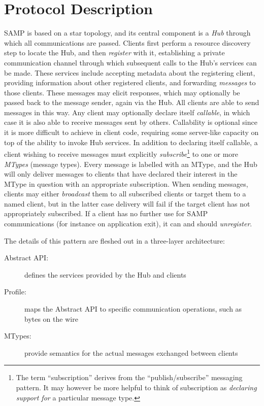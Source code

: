 \documentclass[5p]{elsarticle}
\begin{document}
\section{Protocol Description} \label{sec:protocol}

SAMP is based on a star topology, and its central component is a
{\em Hub\/} through which all communications are passed.
Clients first perform a resource discovery step to locate the Hub,
and then {\em register\/} with it, establishing a private communication
channel through which subsequent calls to the Hub's services can be made.
These services include accepting metadata about the registering client,
providing information about other registered clients,
and forwarding {\em messages\/} to those clients.
These messages may elicit responses, which may optionally be passed
back to the message sender, again via the Hub.
All clients are able to send messages in this way.
Any client may optionally declare itself {\em callable\/},
in which case it is also able to receive messages sent by others.
Callability is optional since it is more difficult to
achieve in client code, requiring some server-like capacity
on top of the ability to invoke Hub services.
In addition to declaring itself callable, a client wishing to
receive messages must explicitly {\em subscribe}\footnote{
   The term ``subscription'' derives from the ``publish/subscribe''
   messaging pattern.  It may however be more helpful to think of
   subscription as {\em declaring support for\/} a particular message type.
}
to one or more {\em MTypes} (message types).
Every message is labelled with an MType,
and the Hub will only deliver messages to clients
that have declared their interest in the MType in question with
an appropriate subscription.  When sending messages, clients may
either {\em broadcast\/} them to all subscribed clients or
target them to a named client, but in the latter case delivery
will fail if the target client has not appropriately subscribed.
If a client has no further use for SAMP communications
(for instance on application exit), it can and should {\em unregister\/}.

The details of this pattern are fleshed out in a three-layer architecture:
\begin{description}
\item[Abstract API:] defines the services provided by the Hub and clients
\item[Profile:] maps the Abstract API to specific communication operations,
  such as bytes on the wire
\item[MTypes:] provide semantics for the actual messages exchanged between
  clients
\end{description}
\end{document}
